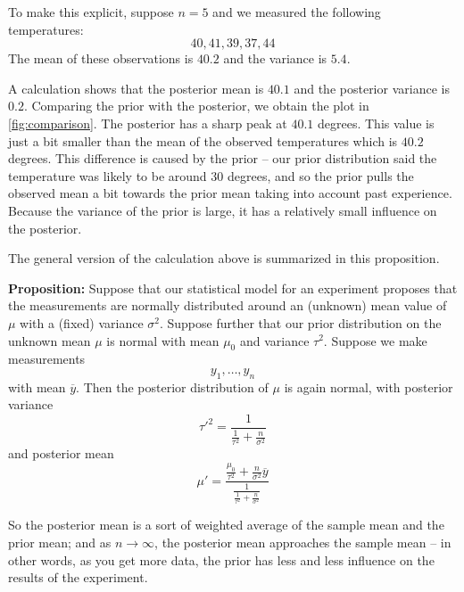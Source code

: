 \documentclass[
]{article}
\begin{document}
To make this explicit, suppose \(n=5\) and we measured the following
temperatures: \[
40, 41,39, 37, 44
\] The mean of these observations is \(40.2\) and the variance is
\(5.4\).

A calculation shows that the posterior mean is \(40.1\) and the
posterior variance is \(0.2\). Comparing the prior with the posterior,
we obtain the plot in \cref{fig:comparison}. The posterior has a sharp
peak at \(40.1\) degrees. This value is just a bit smaller than the mean
of the observed temperatures which is \(40.2\) degrees. This difference
is caused by the prior -- our prior distribution said the temperature
was likely to be around \(30\) degrees, and so the prior pulls the
observed mean a bit towards the prior mean taking into account past
experience. Because the variance of the prior is large, it has a
relatively small influence on the posterior.

The general version of the calculation above is summarized in this
proposition.

\textbf{Proposition:} Suppose that our statistical model for an
experiment proposes that the measurements are normally distributed
around an (unknown) mean value of \(\mu\) with a (fixed) variance
\(\sigma^2\). Suppose further that our prior distribution on the unknown
mean \(\mu\) is normal with mean \(\mu_0\) and variance \(\tau^2\).
Suppose we make measurements \[
y_1,\ldots, y_n
\] with mean \(\overline{y}\). Then the posterior distribution of
\(\mu\) is again normal, with posterior variance \[
\tau'^2 = \frac{1}{\frac{1}{\tau^2}+\frac{n}{\sigma^2}}
\] and posterior mean \[
\mu' = \frac{\frac{\mu_0}{\tau^2}+\frac{n}{\sigma^2}\overline{y}}{\frac{1}{\frac{1}{\tau^2}+\frac{n}{\sigma^2}}}
\]

So the posterior mean is a sort of weighted average of the sample mean
and the prior mean; and as \(n\to\infty\), the posterior mean approaches
the sample mean -- in other words, as you get more data, the prior has
less and less influence on the results of the experiment.
\end{document}
